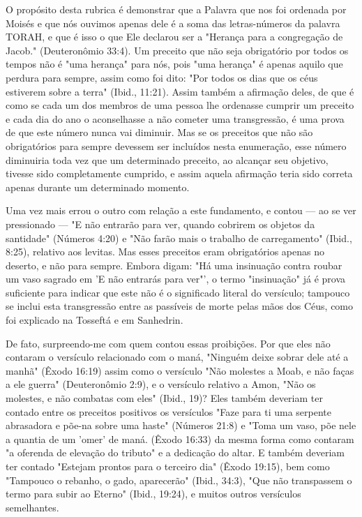 \begin{itemize}
\begin{enumrate}
O propósito desta rubrica é demonstrar que a Palavra que nos foi
ordenada por Moisés e que nós ouvimos apenas dele é a soma das
letras-núme­ros da palavra TORAH, e que é isso o que Ele declarou ser a
"Herança para a congregação de Jacob." (Deuteronômio 33:4). Um preceito
que não seja obri­gatório por todos os tempos não é "uma herança" para
nós, pois "uma heran­ça" é apenas aquilo que perdura para sempre, assim
como foi dito: "Por todos os dias que os céus estiverem sobre a terra"
(Ibid., 11:21). Assim também a afir­mação deles, de que é como se cada
um dos membros de uma pessoa lhe orde­nasse cumprir um preceito e cada
dia do ano o aconselhasse a não cometer uma transgressão, é uma prova de
que este número nunca vai diminuir. Mas se os preceitos que não são
obrigatórios para sempre devessem ser incluídos nesta enumeração, esse
número diminuiria toda vez que um determinado preceito, ao alcançar seu
objetivo, tivesse sido completamente cumprido, e assim aquela afirmação
teria sido correta apenas durante um determinado momento.

Uma vez mais errou o outro com relação a este fundamento, e con­tou ---
ao se ver pressionado --- "E não entrarão para ver, quando cobrirem os
objetos da santidade" (Números 4:20) e "Não farão mais o trabalho de
carre­gamento" (Ibid., 8:25), relativo aos levitas. Mas esses preceitos
eram obrigató­rios apenas no deserto, e não para sempre. Embora digam:
"Há uma insinuação contra roubar um vaso sagrado em 'E não entrarás para
ver"', o termo "insi­nuação" já é prova suficiente para indicar que este
não é o significado literal do versículo; tampouco se inclui esta
transgressão entre as passíveis de morte pelas mãos dos Céus, como foi
explicado na Tosseftá e em Sanhedrin.

De fato, surpreendo-me com quem contou essas proibições. Por que eles
não contaram o versículo relacionado com o maná, "Ninguém deixe so­brar
dele até a manhã" (Êxodo 16:19) assim como o versículo "Não molestes a
Moab, e não faças a ele guerra" (Deuteronômio 2:9), e o versículo
relativo a Amon, "Não os molestes, e não combatas com eles" (Ibid., 19)?
Eles também deveriam ter contado entre os preceitos positivos os
versículos "Faze para ti uma serpente abrasadora e põe-na sobre uma
haste" (Números 21:8) e "Toma um vaso, põe nele a quantia de um 'omer'
de maná. (Êxodo 16:33) da mesma forma como contaram "a
oferenda de elevação do tributo" e a dedicação do altar. E também
deveriam ter contado "Estejam prontos para o terceiro dia" (Êxodo
19:15), bem como "Tampouco o rebanho, o gado, aparecerão" (Ibid., 34:3),
"Que não transpassem o termo para subir ao Eterno" (Ibid., 19:24), e
muitos outros versículos semelhantes.


\end{enumrate}
\end{itemize}
